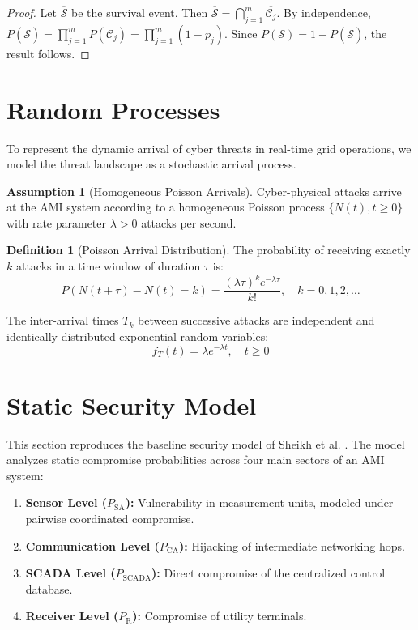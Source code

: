 \documentclass[12pt, oneside, a4paper]{report}
\theoremstyle{definition}
\newtheorem{definition}[theorem]{Definition}
\newtheorem{assumption}[theorem]{Assumption}
\theoremstyle{remark}
\newcommand{\Psa}{P_{\mathrm{SA}}}
\newcommand{\Pca}{P_{\mathrm{CA}}}
\newcommand{\Pscada}{P_{\mathrm{SCADA}}}
\renewcommand{\Pr}{P_{\mathrm{R}}}
\begin{document}
\begin{proof}
Let $\overline{\mathcal{S}}$ be the survival event. Then $\overline{\mathcal{S}} = \bigcap_{j=1}^m \overline{\mathcal{C}_j}$. By independence, $P(\overline{\mathcal{S}}) = \prod_{j=1}^m P(\overline{\mathcal{C}_j}) = \prod_{j=1}^m (1 - p_j)$. Since $P(\mathcal{S}) = 1 - P(\overline{\mathcal{S}})$, the result follows.
\end{proof}

\section{Random Processes}
\label{sec:sm:processes}

To represent the dynamic arrival of cyber threats in real-time grid operations, we model the threat landscape as a stochastic arrival process.

\begin{assumption}[Homogeneous Poisson Arrivals]
Cyber-physical attacks arrive at the AMI system according to a homogeneous Poisson process $\{N(t), t \ge 0\}$ with rate parameter $\lambda > 0$ attacks per second.
\end{assumption}

\begin{definition}[Poisson Arrival Distribution]
The probability of receiving exactly $k$ attacks in a time window of duration $\tau$ is:
\begin{equation}
P(N(t+\tau) - N(t) = k) = \frac{(\lambda \tau)^k e^{-\lambda \tau}}{k!}, \quad k = 0, 1, 2, \ldots
\end{equation}
\end{definition}
The inter-arrival times $T_k$ between successive attacks are independent and identically distributed exponential random variables:
\begin{equation}
f_{T}(t) = \lambda e^{-\lambda t}, \quad t \ge 0
\end{equation}

\section{Static Security Model}
\label{sec:sm:static_model}

This section reproduces the baseline security model of Sheikh et al. \cite{sheikh2020}. The model analyzes static compromise probabilities across four main sectors of an AMI system:
\begin{enumerate}
  \item \textbf{Sensor Level ($\Psa$):} Vulnerability in measurement units, modeled under pairwise coordinated compromise.
  \item \textbf{Communication Level ($\Pca$):} Hijacking of intermediate networking hops.
  \item \textbf{SCADA Level ($\Pscada$):} Direct compromise of the centralized control database.
  \item \textbf{Receiver Level ($\Pr$):} Compromise of utility terminals.
\end{enumerate}
\end{document}
